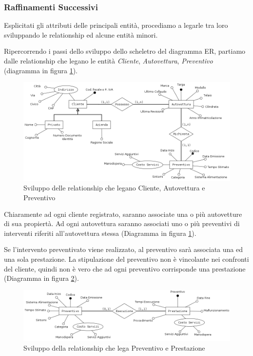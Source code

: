 		\subsubsection{Raffinamenti Successivi}
			
			Esplicitati gli attributi delle principali entità, procediamo a legarle tra loro sviluppando le relationship ed alcune entità minori.
			
			Ripercorrendo i passi dello sviluppo dello scheletro del diagramma ER, partiamo dalle relationship che legano le entità \emph{Cliente}, \emph{Autovettura}, \emph{Preventivo} (diagramma in figura \ref{fig:cliente_autovettura_preventivo}).		
		
			\begin{figure}[H]
				\centering
				\includegraphics[width=13cm]{images/finitures/cliente_autovettura_preventivo.png}
				\caption{Sviluppo delle relationship che legano Cliente, Autovettura e Preventivo}
				\label{fig:cliente_autovettura_preventivo}
			\end{figure}
			
			Chiaramente ad ogni cliente registrato, saranno associate una o più autovetture di sua propiertà. Ad ogni autovettura saranno associati uno o più preventivi di interventi riferiti all'autovettura stessa (Diagramma in figura \ref{fig:cliente_autovettura_preventivo}).
			
			Se l'intervento preventivato viene realizzato, al preventivo sarà associata una ed una sola prestazione. La stipulazione del preventivo non è vincolante nei confronti del cliente, quindi non è vero che ad ogni preventivo corrisponde una prestazione (Diagramma in figura \ref{fig:preventivo_prestazione}).
			
			\begin{figure}[H]
				\centering
				\includegraphics[width=13cm]{images/finitures/preventivo_prestazione.png}
				\caption{Sviluppo della relationship che lega Preventivo e Prestazione}
				\label{fig:preventivo_prestazione}
			\end{figure}
			
